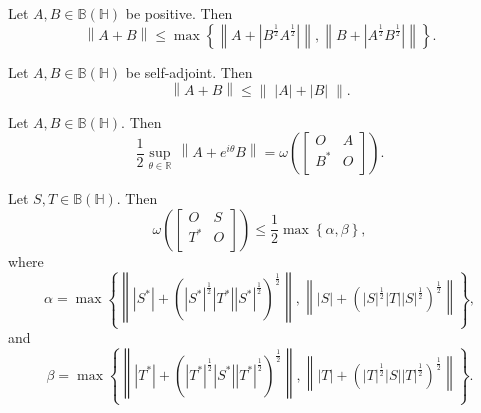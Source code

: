 \documentclass[10pt,a4paper]{amsart}
\begin{document}
\begin{lemma}\label{k1}
 Let $A,B\in \mathbb B\left( \mathbb H \right)$ be positive. Then
\begin{equation}
\left\| A+B \right\|\le \max \left\{ \left\| A+\left| {{B}^{\frac{1}{2}}}{{A}^{\frac{1}{2}}} \right| \right\|,\left\| B+\left| {{A}^{\frac{1}{2}}}{{B}^{\frac{1}{2}}} \right| \right\| \right\}.
\end{equation}	
\end{lemma}

\begin{lemma}\label{2}
Let $A,B\in \mathbb B\left( \mathbb H \right)$ be self-adjoint. Then
\[\left\| A+B \right\|\le \left\| \;\left| A \right|+\left| B \right| \;\right\|.\]
\end{lemma}

\begin{lemma}\label{3}
Let $A,B\in \mathbb B\left( \mathbb H \right)$. Then
\[\frac{1}{2}\underset{\theta \in \mathbb{R}}{\mathop{\sup }}\,\left\| A+{{e}^{i\theta }}B \right\|=\omega \left( \left[ \begin{matrix}
   O & A  \\
   {{B}^{*}} & O  \\
\end{matrix} \right] \right).\]
\end{lemma}

\begin{theorem}\label{24}
Let $S, T\in \mathbb B\left( \mathbb H \right)$. Then 
\[\omega \left( \left[ \begin{matrix}
   O & S  \\
   {{T}^{*}} & O  \\
\end{matrix} \right] \right)\le \frac{1}{2}\max \left\{ \alpha ,\beta  \right\},\]
where
\[\alpha =\max \left\{ \left\| \left| {{S}^{*}} \right|+{{\left( {{\left| {{S}^{*}} \right|}^{\frac{1}{2}}}\left| {{T}^{*}} \right|{{\left| {{S}^{*}} \right|}^{\frac{1}{2}}} \right)}^{\frac{1}{2}}} \right\|,\left\| \left| S \right|+{{\left( {{\left| S \right|}^{\frac{1}{2}}}\left| T \right|{{\left| S \right|}^{\frac{1}{2}}} \right)}^{\frac{1}{2}}} \right\| \right\},\]
and
\[\beta =\max \left\{ \left\| \left| {{T}^{*}} \right|+{{\left( {{\left| {{T}^{*}} \right|}^{\frac{1}{2}}}\left| {{S}^{*}} \right|{{\left| {{T}^{*}} \right|}^{\frac{1}{2}}} \right)}^{\frac{1}{2}}} \right\|,\left\| \left| T \right|+{{\left( {{\left| T \right|}^{\frac{1}{2}}}\left| S \right|{{\left| T \right|}^{\frac{1}{2}}} \right)}^{\frac{1}{2}}} \right\| \right\}.\]
\end{theorem}
\end{document}
